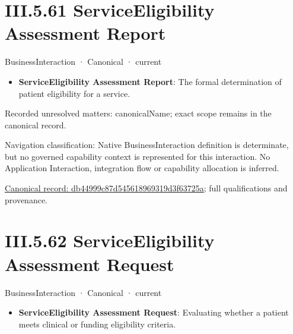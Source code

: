 \section*{III.5.61 ServiceEligibility Assessment Report}
\label{navigation:III.5.61}

\label{element:db44999c87d545618969319d3f63725a}
{\small BusinessInteraction · Canonical · current}\par

\begin{itemize}


\item \textbf{ServiceEligibility Assessment Report}: The formal determination of patient eligibility for a service.

\end{itemize}

{\small Recorded unresolved matters: canonicalName; exact scope remains in the canonical record.}\par
{\small Navigation classification: Native BusinessInteraction definition is determinate, but no governed capability context is represented for this interaction. No Application Interaction, integration flow or capability allocation is inferred.}\par
{\footnotesize \href{../../../../../../../continuum/business/business-interaction/db44999c87d545618969319d3f63725a.md}{Canonical record: db44999c87d545618969319d3f63725a}; full qualifications and provenance.}\par
\section*{III.5.62 ServiceEligibility Assessment Request}
\label{navigation:III.5.62}

\label{element:1508d1e33b264534bbcde367eb3dc6a3}
{\small BusinessInteraction · Canonical · current}\par

\begin{itemize}


\item \textbf{ServiceEligibility Assessment Request}: Evaluating whether a patient meets clinical or funding eligibility criteria.

\end{itemize}

